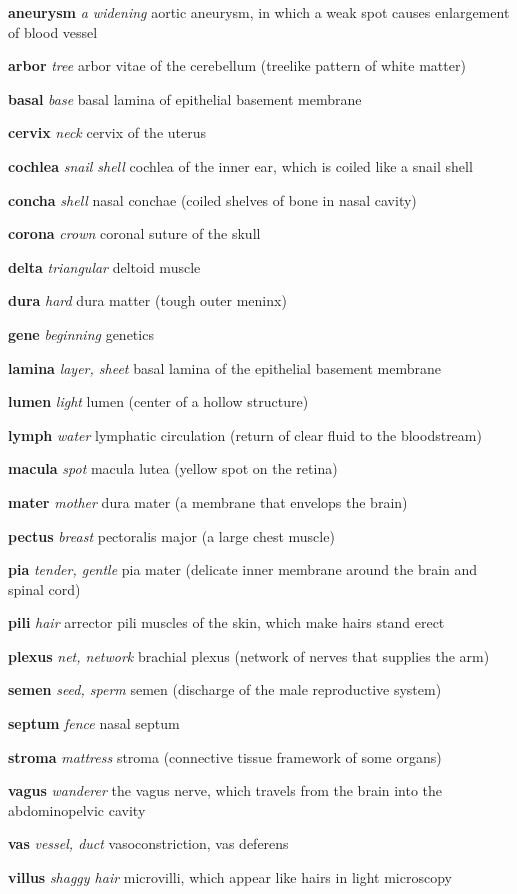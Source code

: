 \documentclass[10pt]{article}
\begin{document}
\begin{multicols}{2}
 \begin{hangparas}{10pt}{1}
 \textbf{aneurysm} \textit{a widening} aortic aneurysm, in which a weak spot causes enlargement of blood vessel \par
 \textbf{arbor } \textit{tree } arbor vitae of the cerebellum (treelike pattern of white matter) \par
 \textbf{basal } \textit{base } basal lamina of epithelial basement membrane \par
 \textbf{cervix } \textit{neck } cervix of the uterus \par
 \textbf{cochlea } \textit{snail shell} cochlea of the inner ear, which is coiled like a snail shell \par
 \textbf{concha } \textit{shell } nasal conchae (coiled shelves of bone in nasal cavity) \par
 \textbf{corona } \textit{crown } coronal suture of the skull \par
 \textbf{delta } \textit{triangular} deltoid muscle \par
 \textbf{dura } \textit{hard } dura matter (tough outer meninx) \par
 \textbf{gene} \textit{beginning} genetics \par
 \textbf{lamina} \textit{layer, sheet} basal lamina of the epithelial basement membrane \par
 \textbf{lumen} \textit{light} lumen (center of a hollow structure) \par
 \textbf{lymph} \textit{water} lymphatic circulation (return of clear fluid to the bloodstream) \par
 \textbf{macula} \textit{spot} macula lutea (yellow spot on the retina) \par
 \textbf{mater} \textit{mother} dura mater (a membrane that envelops the brain) \par
 \textbf{pectus} \textit{breast} pectoralis major (a large chest muscle) \par
 \textbf{pia} \textit{tender, gentle} pia mater (delicate inner membrane around the brain and spinal cord) \par
 \textbf{pili} \textit{hair} arrector pili muscles of the skin, which make hairs stand erect \par
 \textbf{plexus} \textit{net, network} brachial plexus (network of nerves that supplies the arm) \par
 \textbf{semen} \textit{seed, sperm} semen (discharge of the male reproductive system) \par
 \textbf{septum} \textit{fence} nasal septum \par
 \textbf{stroma} \textit{mattress} stroma (connective tissue framework of some organs) \par
 \textbf{vagus} \textit{wanderer} the vagus nerve, which travels from the brain into the abdominopelvic cavity \par
 \textbf{vas} \textit{vessel, duct} vasoconstriction, vas deferens \par
 \textbf{villus} \textit{shaggy hair} microvilli, which appear like hairs in light microscopy
 \end{hangparas}


\end{multicols}
\end{document}
